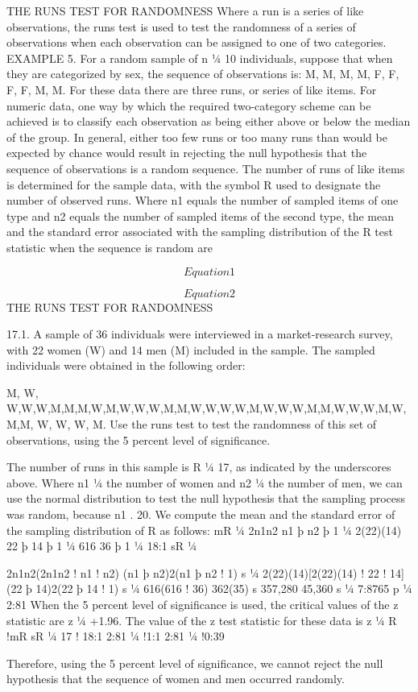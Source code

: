 THE RUNS TEST FOR RANDOMNESS
Where a run is a series of like observations, the runs test is used to test the randomness of a series of
observations when each observation can be assigned to one of two categories.
EXAMPLE 5. For a random sample of n ¼ 10 individuals, suppose that when they are categorized by sex, the sequence of
observations is: M, M, M, M, F, F, F, F, M, M. For these data there are three runs, or series of like items.
For numeric data, one way by which the required two-category scheme can be achieved is to classify each
observation as being either above or below the median of the group. In general, either too few runs or too many
runs than would be expected by chance would result in rejecting the null hypothesis that the sequence of
observations is a random sequence.
The number of runs of like items is determined for the sample data, with the symbol R used to designate the
number of observed runs. Where n1 equals the number of sampled items of one type and n2 equals the number of
sampled items of the second type, the mean and the standard error associated with the sampling distribution of
the R test statistic when the sequence is random are


\[ Equation 1 \]

\[ Equation 2\]
THE RUNS TEST FOR RANDOMNESS

17.1. A sample of 36 individuals were interviewed in a market-research survey, with 22 women (W) and 14
men (M) included in the sample. The sampled individuals were obtained in the following order: 

M, W,
W,W,W,M,M,M,W,M,W,W,W,M,M,W,W,W,W,M,W,W,W,M,M,W,W,W,M,W,M,M,
W, W, W, M. 
Use the runs test to test the randomness of this set of observations, using the 5 percent
level of significance.

The number of runs in this sample is R ¼ 17, as indicated by the underscores above. Where n1 ¼ the number of
women and n2 ¼ the number of men, we can use the normal distribution to test the null hypothesis that the sampling
process was random, because n1 . 20. We compute the mean and the standard error of the sampling distribution of
R as follows:
mR ¼
2n1n2
n1 þ n2 þ 1 ¼
2(22)(14)
22 þ 14 þ 1 ¼
616
36 þ 1 ¼ 18:1
sR ¼

2n1n2(2n1n2 ! n1 ! n2)
(n1 þ n2)2(n1 þ n2 ! 1)
s
¼
2(22)(14)[2(22)(14) ! 22 ! 14]
(22 þ 14)2(22 þ 14 ! 1)
s
¼
616(616 ! 36)
362(35)
s
357,280
45,360
s
¼
7:8765 p
¼ 2:81
When the 5 percent level of significance is used, the critical values of the z statistic are z ¼ +1.96. The value
of the z test statistic for these data is
z ¼
R !mR
sR ¼
17 ! 18:1
2:81 ¼ !1:1
2:81 ¼ !0:39

Therefore, using the 5 percent level of significance, we cannot reject the null hypothesis that the sequence of
women and men occurred randomly.
